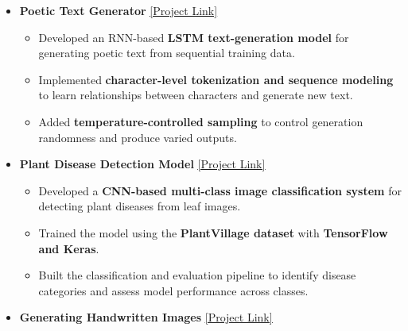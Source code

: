 \documentclass[a4paper,10pt]{article}
\newcommand{\isep}{-2 pt}
\begin{document}
\begin{itemize}
\begin{itemize}
        \item \textbf{Poetic Text Generator}
        \underline{\href{https://github.com/devvrat-hans/Poetic-Text-Generator-using-RNN}{[Project Link]}}
        \\[-0.5cm]

        \begin{itemize}\itemsep \isep

            \item Developed an RNN-based \textbf{LSTM text-generation model} for generating poetic text from sequential training data.

            \item Implemented \textbf{character-level tokenization and sequence modeling} to learn relationships between characters and generate new text.

            \item Added \textbf{temperature-controlled sampling} to control generation randomness and produce varied outputs.

        \end{itemize}


        \item \textbf{Plant Disease Detection Model}
        \underline{\href{https://github.com/devvrat-hans/Plant-Disease-Detection}{[Project Link]}}
        \\[-0.5cm]

        \begin{itemize}\itemsep \isep

            \item Developed a \textbf{CNN-based multi-class image classification system} for detecting plant diseases from leaf images.

            \item Trained the model using the \textbf{PlantVillage dataset} with \textbf{TensorFlow and Keras}.

            \item Built the classification and evaluation pipeline to identify disease categories and assess model performance across classes.

        \end{itemize}


        \item \textbf{Generating Handwritten Images}
        \underline{\href{https://github.com/devvrat-hans/Generating-Handwritten-Digit-Images}{[Project Link]}}
        \\[-0.5cm]


\end{itemize}
\end{itemize}
\end{document}
